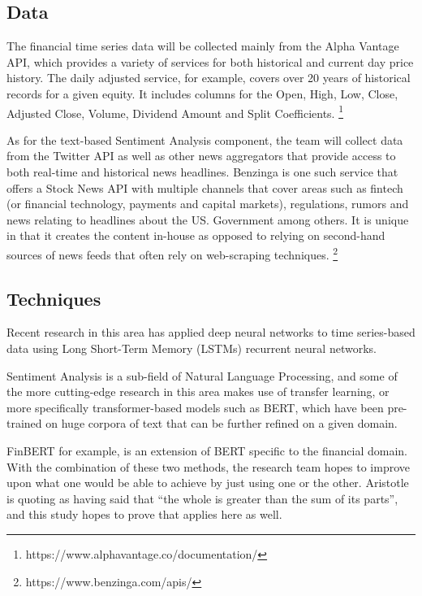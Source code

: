 \documentclass{llncs}
\begin{document}
\subsection{Data}

The financial time series data will be collected mainly from the Alpha Vantage API, which provides a variety of services for both historical and current day price history. The daily adjusted service, for example, covers over 20 years of historical records for a given equity.  It includes columns for the Open, High, Low, Close, Adjusted Close, Volume, Dividend Amount and Split Coefficients.
\footnote{https://www.alphavantage.co/documentation/}


As for the text-based Sentiment Analysis component, the team will collect data from the Twitter API as well as other news aggregators that provide access to both real-time and historical news headlines.  Benzinga is one such service that offers a Stock News API with multiple channels that cover areas such as fintech (or financial technology, payments and capital markets), regulations, rumors and news relating to headlines about the US. Government among others.  It is unique in that it creates the content in-house as opposed to relying on second-hand sources of news feeds that often rely on web-scraping techniques.
\footnote{https://www.benzinga.com/apis/}

\subsection{Techniques}

Recent research in this area has applied deep neural networks to time series-based data using Long Short-Term Memory (LSTMs) recurrent neural networks.

Sentiment Analysis is a sub-field of Natural Language Processing, and some of the more cutting-edge research in this area makes use of transfer learning, or more specifically transformer-based models such as BERT, which have been pre-trained on huge corpora of text that can be further refined on a given domain.

FinBERT for example, is an extension of BERT specific to the financial domain.
With the combination of these two methods, the research team hopes to improve upon what one would be able to achieve by just using one or the other. Aristotle is quoting as having said that “the whole is greater than the sum of its parts”, and this study hopes to prove that applies here as well.
\end{document}
